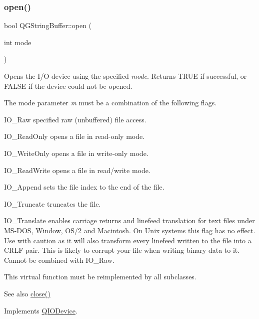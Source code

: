 \subsubsection{\texorpdfstring{open()}{open()}}
{\footnotesize\ttfamily bool Q\+G\+String\+Buffer\+::open (\begin{DoxyParamCaption}\item[{int}]{mode }\end{DoxyParamCaption})\hspace{0.3cm}{\ttfamily [virtual]}}

Opens the I/O device using the specified {\itshape mode}. Returns T\+R\+UE if successful, or F\+A\+L\+SE if the device could not be opened.

The mode parameter {\itshape m} must be a combination of the following flags. 
\begin{DoxyItemize}
\item {\ttfamily I\+O\+\_\+\+Raw} specified raw (unbuffered) file access. 
\item {\ttfamily I\+O\+\_\+\+Read\+Only} opens a file in read-\/only mode. 
\item {\ttfamily I\+O\+\_\+\+Write\+Only} opens a file in write-\/only mode. 
\item {\ttfamily I\+O\+\_\+\+Read\+Write} opens a file in read/write mode. 
\item {\ttfamily I\+O\+\_\+\+Append} sets the file index to the end of the file. 
\item {\ttfamily I\+O\+\_\+\+Truncate} truncates the file. 
\item {\ttfamily I\+O\+\_\+\+Translate} enables carriage returns and linefeed translation for text files under M\+S-\/\+D\+OS, Window, O\+S/2 and Macintosh. On Unix systems this flag has no effect. Use with caution as it will also transform every linefeed written to the file into a C\+R\+LF pair. This is likely to corrupt your file when writing binary data to it. Cannot be combined with {\ttfamily I\+O\+\_\+\+Raw}. 
\end{DoxyItemize}

This virtual function must be reimplemented by all subclasses.

\begin{DoxySeeAlso}{See also}
\mbox{\hyperlink{class_q_g_string_buffer_a02458102f8968ef46bfaeab319f8e2fc}{close()}} 
\end{DoxySeeAlso}


Implements \mbox{\hyperlink{class_q_i_o_device_ae4046ae7bf4d4cee1010239973314e42}{Q\+I\+O\+Device}}.

